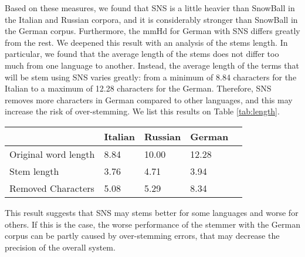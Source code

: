 Based on these measures, we found that SNS is a little heavier than SnowBall in the Italian and Russian corpora, and it is considerably stronger than SnowBall in the German corpus. Furthermore, the mmHd for German with SNS differs greatly from the rest. We deepened this result with an analysis of the stems length. In particular, we found that the average length of the stems does not differ too much from one language to another. Instead, the average length of the terms that will be stem using SNS varies greatly: from a minimum of 8.84 characters for the Italian to a maximum of 12.28 characters for the German. Therefore, SNS removes more characters in German compared to other languages, and this may increase the risk of over-stemming. We list this results on Table \ref{tab:length}.

\begin{center}
   \begin{tabular}{| l | l | l | l | l |}
    \hline
    & Italian & Russian & German\\ \hline
    Original word length & 8.84 & 10.00 & 12.28\\ \hline
    Stem length & 3.76 & 4.71 & 3.94\\ \hline   
    Removed Characters & 5.08 & 5.29 &  8.34\\ \hline
    \end{tabular}
    \label{tab:length}
\end{center}

This result suggests that SNS may stems better for some languages and worse for others. If this is the case, the worse performance of the stemmer with the German corpus can be partly caused by over-stemming errors, that may decrease the precision of the overall system. 